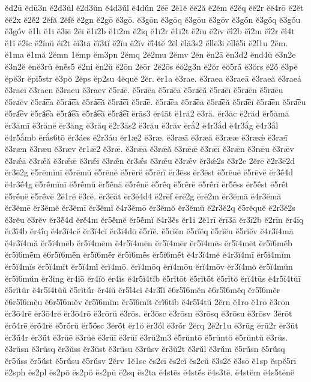 {ĕd2ū
ĕdū3n
ĕ2d3ŭl
ĕ2d3ŭn
ĕ4d3ŭ́l
ĕ4dŭ́n
2ĕē
2ĕ1ĕ
ĕĕ2ă
ĕ2ĕm
ĕ2ĕq
ĕĕ2r
ĕĕ4rō
ĕ2ĕt
ĕĕ2x
ĕ2ĕ́2
2ĕfă
2ĕfĕ
ĕ2gn
ĕ2gō
ĕ3gō.
ĕ3gōn
ĕ3gōq
ĕ3gōu
ĕ3gōv
ĕ3gṓn
ĕ3gṓq
ĕ3gṓu
ĕ3gṓv
ĕ1h
ĕ1i
ĕ3iē
2ĕī
ĕ1ī2b
ĕ1ī2m
ĕ2īq
ĕ1ī2r
ĕ1ī2t
ĕ2īu
ĕ2īv
ĕī́2b
ĕī́2m
ĕī́2r
ĕī́4t
ĕ1ĭ
ĕ2ĭc
ĕ2ĭnŭ
ĕĭ2t
ĕĭ3tā
ĕĭ3tĭ
ĕ2ĭu
ĕ2ĭv
ĕĭ́4tĕ
2ĕl
ĕlă3s2
ĕllē3i
ĕllḗ5i
ĕ2l1u
2ĕm.
ĕ1ma
ĕ1mă
2ĕmn
1ĕmp
ĕm3pn
2ĕmq
2ĕ2mu
2ĕmv
2ĕn
ĕn2ā
ĕn3d2
ĕnd4ŭ
ĕ3n2e
ĕ3n2ĕ
ĕnĕ3rŭ
ĕnĕ́s5
ĕ2ni
ĕn2ŭ
ĕ2ōn
2ĕōr
2ĕ2ōs
ĕŏ2g3n
ĕ2ŏr
ĕŏ5rā́
ĕ3ŏrs
ĕ2ŏ́
ĕ3pĕ
ĕpĕ3r
ĕpĭ5str
ĕ3pŏ
2ĕps
ĕp2su
4ĕquĕ
2ĕr.
ĕr1a
ĕ3rae.
ĕ3raea
ĕ3raeā
ĕ3raeă
ĕ3raeá
ĕ3raeī
ĕ3raen
ĕ3raeu
ĕ3raev
ĕ5ra͞e.
ĕ5ra͞ea
ĕ5ra͞eā
ĕ5ra͞eă
ĕ5ra͞eī
ĕ5ra͞en
ĕ5ra͞eu
ĕ5ra͞ev
ĕ5rá͞ea
ĕ5rá͞eā
ĕ5rá͞eă
ĕ5rá͞eī
ĕ5ra͡e.
ĕ5ra͡ea
ĕ5ra͡eā
ĕ5ra͡eă
ĕ5ra͡eī
ĕ5ra͡en
ĕ5ra͡eu
ĕ5ra͡ev
ĕ5rá͡ea
ĕ5rá͡eā
ĕ5rá͡eă
ĕ5rá͡eī
ĕrās3
ĕr4āt
ĕ1ră2
ĕ3ră.
ĕr3ăc
ĕ2răd
ĕr5ămă
ĕr3ămī
ĕ3rănĕ
ĕr3ăng
ĕ3răq
ĕ2r3ăs2
ĕ3rău
ĕ3răv
ĕrắ2
ĕ4r3ắd
ĕ4r3ắg
ĕ4r3ắl
ĕ4r5ắmb
ĕrắs6tō
ĕr3áes
ĕ2r3áu
ĕr1æ2
ĕ3ræ.
ĕ3ræā
ĕ3ræă
ĕ3rææ
ĕ3ræǽ
ĕ3ræī
ĕ3ræn
ĕ3ræu
ĕ3ræv
ĕr1ǣ2
ĕ3rǣ.
ĕ3rǣā
ĕ3rǣă
ĕ3rǣǣ
ĕ3rǣī
ĕ3rǣn
ĕ3rǣu
ĕ3rǣv
ĕ3rǣ́ā
ĕ3rǣ́ă
ĕ3rǣ́ǣ
ĕ3rǣ́ī
ĕ3rǣ́n
ĕr3ǣ́s
ĕ3rǣ́u
ĕ3rǣ́v
ĕr3ǽ2s
ĕ3r2e
2ĕrē
ĕ2r3ē2d
ĕr3ē2g
ĕ5rēmĭnī
ĕ5rēmŭ
ĕ5rēnĕ
ĕ5rērĕ
ĕ5rērĭ
ĕr3ēss
ĕr3ēst
ĕ5rēuĕ
ĕ5rēvĕ
ĕr3ḗ4d
ĕ4r3ḗ4g
ĕ5rḗmĭnī
ĕ5rḗmŭ
ĕr5ḗnă
ĕ5rḗnĕ
ĕ5rḗq
ĕ5rḗrĕ
ĕ5rḗrĭ
ĕr5ḗss
ĕr5ḗst
ĕ5rḗt
ĕ5rḗuĕ
ĕ5rḗvĕ
2ĕ1rĕ
ĕ3rĕ.
ĕr3ĕăt
ĕr3ĕ4d4
ĕ2rĕf
ĕrĕ2g
ĕrĕ2m
ĕr3ĕmā
ĕ4r3ĕmă
ĕr3ĕmē
ĕr3ĕmĕ
ĕr3ĕmī
ĕr3ĕmĭ
ĕ4r3ĕmō
ĕr3ĕmŏ
ĕr3ĕmŭ
ĕ2r3ĕ2q
ĕ5rĕquĕ
ĕ2r3ĕ2s
ĕ3rĕu
ĕ3rĕv
ĕr3ĕ́4d
ĕrĕ́4m
ĕr5ĕ́mĕ
ĕr5ĕ́mĭ
ĕ4r3ĕ́s
ĕr1i
2ĕ1rī
ĕrī3ā
ĕr3ī2b
ĕ2rīn
ĕr4īq
ĕr3ī́4b
ĕr4ī́q
ĕ4r3ĭ4cĕ
ĕr3ĭ4cĭ
ĕr3ĭ4dō
ĕ5rĭĕ.
ĕ5rĭĕn
ĕ5rĭĕq
ĕ5rĭĕu
ĕ5rĭĕv
ĕ4r3ĭ4mā
ĕ4r3ĭ4mă
ĕr5ĭ4mēb
ĕr5ĭ4mēm
ĕ4r5ĭ4mēn
ĕr5ĭ4mēr
ĕr5ĭ4mēs
ĕr5ĭ4mēt
ĕr5ĭ6mḗb
ĕr5ĭ6mḗm
ĕ6r5ĭ6mḗn
ĕr5ĭ6mḗr
ĕr5ĭ6mḗs
ĕr5ĭ6mḗt
ĕ4r3ĭ4mĕ
ĕ4r3ĭ4mī
ĕr5ĭ4mĭm
ĕr5ĭ4mĭs
ĕr5ĭ4mĭt
ĕr5ĭ4mĭ́
ĕrĭ4mō.
ĕrĭ4mōq
ĕrĭ4mōu
ĕrĭ4mōv
ĕr3ĭ4mŏ
ĕr5ĭ4mŭn
ĕr5ĭ6mŭ́n
ĕr3ĭng
ĕr4ĭō
ĕr4ĭŏ
ĕr4ĭs
ĕ4r5ĭ4tĭb
ĕ5rĭtōt
ĕ5rĭtṓt
ĕ5rĭtŏ
ĕrĭ4tūs
ĕ4r5ĭ4tŭī
ĕ5rĭtŭr
ĕ4r5ĭ4tŭŭ
ĕ5rĭtŭ́r
ĕr4ĭŭ
ĕr5ĭ́4cĭ
ĕ4r3ĭ́ĭ
ĕ6r5ĭ́6mĕn
ĕ6r5ĭ́6mĕq
ĕr5ĭ́6mĕr
ĕ6r5ĭ́6mĕu
ĕ6r5ĭ́6mĕv
ĕr5ĭ́6mĭm
ĕr5ĭ́6mĭt
ĕrĭ́6tĭb
ĕ4r5ĭ́4tŭ
2ĕrn
ĕ1ro
ĕ1rō
ĕ3rōn
ĕr3ō4rē
ĕr3ō4rĕ
ĕr3ō4rō
ĕ3rōrŭ
ĕ3rōs.
ĕr3ōsc
ĕ3rōsn
ĕ3rōsq
ĕ3rōsu
ĕ3rōsv
3ĕrōt
ĕrṓ4rē
ĕrṓ4rĕ
ĕ5rṓrŭ
ĕr5ṓsc
3ĕrṓt
ĕr1ŏ
ĕr3ŏ́l
ĕ3rŏ́r
2ĕrq
2ĕ2r1u
ĕ3rūg
ĕrū2r
ĕr3ūt
ĕr3ū́4r
ĕr3ū́t
ĕ3rŭē
ĕ3rŭĕ
ĕ3rŭī
ĕ3rŭĭ
ĕ3rŭ2m3
ĕ5rŭntō
ĕ5rŭntŏ
ĕ5rŭntŭ
ĕ3rŭs.
ĕ3rŭsn
ĕ3rŭsq
ĕr3ŭss
ĕr3ŭst
ĕ3rŭsu
ĕ3rŭsv
ĕr3ŭ2t
ĕ3rŭ́l
ĕ3rŭ́m
ĕ5rŭ́sn
ĕ5rŭ́sq
ĕr5ŭ́ss
ĕr5ŭ́st
ĕ5rŭ́su
ĕ5rŭ́sv
2ĕrv
1ĕ1sc
ĕs2cī
ĕs2cĭ
ĕs2cŭ
ĕ3s2ĕ
ĕ3sō
ĕ1sp
ĕspĕ5rī
ĕ2sph
ĕs2pl
ĕs2pō
ĕs2pŏ
ĕs2pŭ
ĕ2sq
ĕs2ta
ĕ4stēs
ĕ4stḗs
ĕ4s3tĕ.
ĕ4stĕm
ĕ4s5tĕnĕ
}
